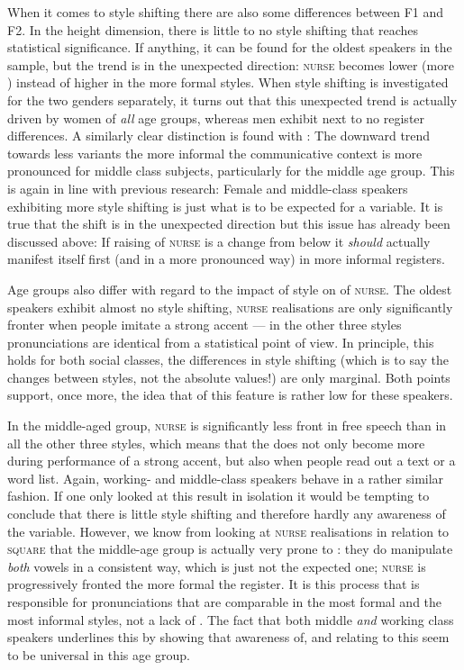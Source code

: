 When it comes to style shifting there are also some differences between F1 and F2.
In the height dimension, there is little to no style shifting that reaches statistical significance.
If anything, it can be found for the oldest speakers in the sample, but the trend is in the unexpected direction: \textsc{nurse} becomes lower (more ) instead of higher in the more formal styles.
When style shifting is investigated for the two genders separately, it turns out that this unexpected trend is actually driven by women of \emph{all} age groups, whereas men exhibit next to no register differences.
A similarly clear distinction is found with : The downward trend towards less  variants the more informal the communicative context is more pronounced for middle class subjects, particularly for the middle age group.
This is again in line with previous research: Female and middle-class speakers exhibiting more style shifting is just what is to be expected for a  variable.
It is true that the shift is in the unexpected direction but this issue has already been discussed above: If raising of \textsc{nurse} is a change from below it \emph{should} actually manifest itself first (and in a more pronounced way) in more informal registers.

Age groups also differ with regard to the impact of style on  of \textsc{nurse}.
The oldest speakers exhibit almost no style shifting, \textsc{nurse} realisations are only significantly fronter when people imitate a strong  accent --- in the other three styles pronunciations are identical from a statistical point of view.
In principle, this holds for both social classes, the differences in style shifting (which is to say the changes between styles, not the absolute values!) are only marginal.
Both points support, once more, the idea that  of this feature is rather low for these speakers.

In the middle-aged group, \textsc{nurse} is significantly less front in free speech than in all the other three styles, which means that the  does not only become more  during performance of a strong accent, but also when people read out a text or a word list.
Again, working- and middle-class speakers behave in a rather similar fashion.
If one only looked at this result in isolation it would be tempting to conclude that there is little style shifting and therefore hardly any awareness of the variable.
However, we know from looking at \textsc{nurse} realisations in relation to \textsc{square} that the middle-age group is actually very prone to : they do manipulate \emph{both} vowels in a consistent way, which is just not the expected one; \textsc{nurse} is progressively fronted the more formal the register.
It is this process that is responsible for pronunciations that are comparable in the most formal and the most informal styles, not a lack of .
The fact that both middle \emph{and} working class speakers  underlines this by showing that awareness of, and  relating to this  seem to be universal in this age group.

